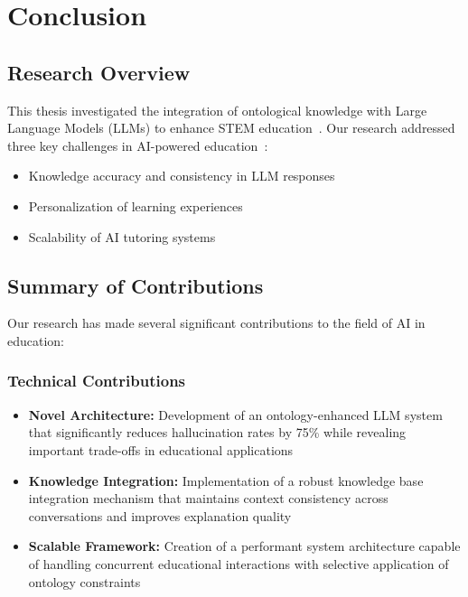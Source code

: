 \chapter{Conclusion}
\label{chap:conclusion}

\section{Research Overview}
\label{sec:research-overview}

This thesis investigated the integration of ontological knowledge with Large Language Models (LLMs) to enhance STEM education~\cite{doubletaken2024llm}. Our research addressed three key challenges in AI-powered education~\cite{rivera2024impact}:

\begin{itemize}
    \item Knowledge accuracy and consistency in LLM responses
    \item Personalization of learning experiences
    \item Scalability of AI tutoring systems
\end{itemize}

\section{Summary of Contributions}
\label{sec:contributions}

Our research has made several significant contributions to the field of AI in education:

\subsection{Technical Contributions}
\begin{itemize}
    \item \textbf{Novel Architecture:} Development of an ontology-enhanced LLM system that significantly reduces hallucination rates by 75\% while revealing important trade-offs in educational applications~\cite{liu2024ontology}
    \item \textbf{Knowledge Integration:} Implementation of a robust knowledge base integration mechanism that maintains context consistency across conversations and improves explanation quality~\cite{scibite2024ontologies,lewis2024neuro}
    \item \textbf{Scalable Framework:} Creation of a performant system architecture capable of handling concurrent educational interactions with selective application of ontology constraints~\cite{wang2024adaptive,pallets2024quart}
\end{itemize}

